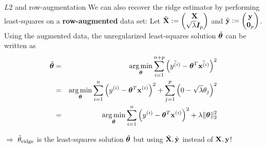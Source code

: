 \documentclass[11pt,compress,t,notes=noshow, xcolor=table]{beamer}
\begin{document}
\begin{vbframe}{$L2$ and row-augmentation}
We can also recover the ridge estimator by performing least-squares on a \textbf{row-augmented} data set: Let $\tilde{\mathbf{X}}:= \begin{pmatrix} \mathbf{X} \\ \sqrt{\lambda} \boldsymbol{I}_{p} \end{pmatrix}$ and $\tilde{\mathbf{y}} := \begin{pmatrix}
    \mathbf{y} \\ \bm{0}_{p}
\end{pmatrix}$. Using the augmented data, the unregularized least-squares solution $\tilde{\bm{\theta}}$ can be written as
\begin{eqnarray*}
\tilde{\thetab} &=& \argmin_{\thetab} 
\sum_{i=1}^{n+p} \left(\tilde{\yi} - \thetab^T \tilde{\xi} \right)^2 \\ &=& \argmin_{\thetab} 
\sum_{i=1}^{n} \left(\yi - \thetab^T \xi \right)^2 + \sum_{j=1}^{p} \left(0 - \sqrt{\lambda} \theta_j \right)^2 \\ %
&=& \argmin_{\thetab} \sumin \left(\yi - \thetab^T \xi \right)^2 + \lambda \|\thetab\|_2^2
\end{eqnarray*}

$\Longrightarrow$ $\hat{\theta}_{\text{ridge}}$ is the least-squares solution $\tilde{\bm{\theta}}$ but using $\tilde{\mathbf{X}},\tilde{\mathbf{y}}$ instead of $\mathbf{X}, \mathbf{y}$!
\end{vbframe}
\end{document}
